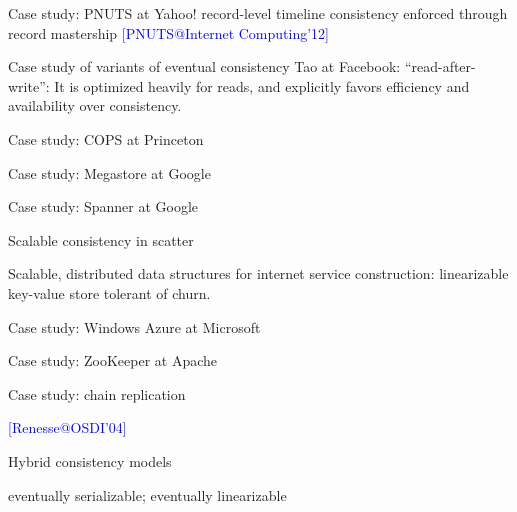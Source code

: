 \documentclass{beamer}
\makeatletter
\newcommand{\citeinbeamer}[3]{{\scriptsize{\textcolor{blue}{[#1@#2'#3]}}}}
\makeatother
\begin{document}
\begin{frame}[label = case-study-pnuts-backup]{Case study: PNUTS at Yahoo!}
  record-level timeline consistency enforced through record mastership
  \citeinbeamer{PNUTS}{Internet Computing}{12}

  \hyperlink{case-study-pnuts-main}{}
\end{frame}
\begin{frame}{Case study of variants of eventual consistency}
  Tao at Facebook:    ``read-after-write'': It is optimized heavily for reads, and explicitly
favors efficiency and availability over consistency.
\end{frame}
\begin{frame}[label = case-study-cops-backup]{Case study: COPS at Princeton}
  \hyperlink{case-study-cops-main}{}
\end{frame}
\begin{frame}[label = case-study-megastore-backup]{Case study: Megastore at
Google}
  \hyperlink{case-study-megastore-main}{}
\end{frame}
\begin{frame}{Case study: Spanner at Google}

\end{frame}
\begin{frame}{}
  Scalable consistency in scatter

  Scalable, distributed data structures for internet service construction:
  linearizable key-value store tolerant of churn.
\end{frame}
\begin{frame}{Case study: Windows Azure at Microsoft}

\end{frame}
\begin{frame}{Case study: ZooKeeper at Apache}

\end{frame}
\begin{frame}[label = case-study-chain-backup]{Case study: chain replication}

  \citeinbeamer{Renesse}{OSDI}{04}
  \hyperlink{design-elements-main}{}
\end{frame}
\begin{frame}[label = hybrid-consistency-backup]{Hybrid consistency models}
  \hyperlink{consistency-models-and-design-elements-main}{}

  eventually serializable; eventually linearizable
\end{frame}
\end{document}
